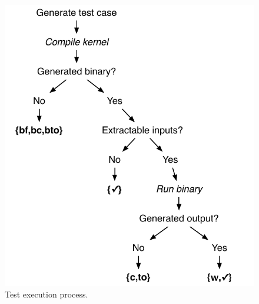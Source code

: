 \begin{figure}
  \centering %
    \includegraphics[width=\columnwidth]{img/test_process}%
  \caption{%
  	Test execution process.%
  }%
  \label{fig:test-process} %
\end{figure}

